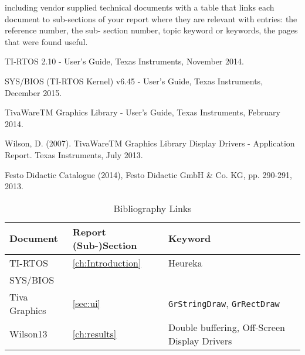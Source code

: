 \begin{thebibliography}{9}

 including vendor supplied technical documents with a table that links each document to sub-sections of your report where they are relevant with entries: the reference number, the sub- section number, topic keyword or keywords, the pages that were found useful.

TI-RTOS 2.10 - User's Guide, Texas Instruments, November 2014.

SYS/BIOS (TI-RTOS Kernel) v6.45 - User's Guide, Texas Instruments, December 2015.

TivaWareTM Graphics Library - User's Guide, Texas Instruments, February 2014.

Wilson, D. (2007). TivaWareTM Graphics Library Display Drivers - Application Report. Texas 
Instruments, July 2013.

Festo Didactic Catalogue (2014), Festo Didactic GmbH \& Co. KG, pp. 290-291, 2013.
 
\end{thebibliography}

\begin{table}[H]
	\begin{tabu} spread \linewidth {l | l | X[m]}
		\textbf{Document} & \textbf{Report (Sub-)Section} & \textbf{Keyword} \\
		\hline
		\hline
		TI-RTOS & \ref{ch:Introduction} & Heureka\\
		\hline
		SYS/BIOS & & \\
		\hline
		Tiva Graphics & \ref{sec:ui} & \texttt{GrStringDraw}, \texttt{GrRectDraw}\\
		\hline
		Wilson13 & \ref{ch:results} & Double buffering, Off-Screen Display Drivers\\	
	\end{tabu}
	\caption{Bibliography Links}
	\label{tab:BibliographyLinks}
\end{table}

\vfill